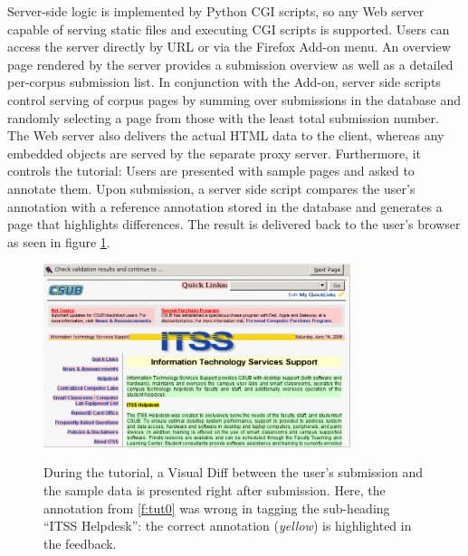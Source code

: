 Server-side logic is implemented by Python CGI scripts, so any Web server capable of serving static files and executing CGI scripts is supported.
Users can access the server directly by URL or via the Firefox Add-on menu.
An overview page rendered by the server provides a submission overview as well as a detailed per-corpus submission list.
In conjunction with the Add-on, server side scripts control serving of corpus pages by summing over submissions in the database and randomly selecting a page from those with the least total submission number.
The Web server also delivers the actual HTML data to the client, whereas any embedded objects are served by the separate proxy server.
Furthermore, it controls the tutorial: Users are presented with sample pages and asked to annotate them.
Upon submission, a server side script compares the user's annotation with a reference annotation stored in the database and generates a page that highlights differences.
The result is delivered back to the user's browser as seen in figure \ref{f:tut1}.

\begin{figure}
	{\includegraphics[width=0.8\textwidth]{tut1}}
\caption{\label{f:tut1}During the tutorial, a Visual Diff between the user's submission and the sample data is presented right after submission.
	Here, the annotation from \ref{f:tut0} was wrong in tagging the sub-heading ``ITSS Helpdesk'': the correct annotation (\textit{yellow}) is highlighted in the feedback.}
\end{figure}

